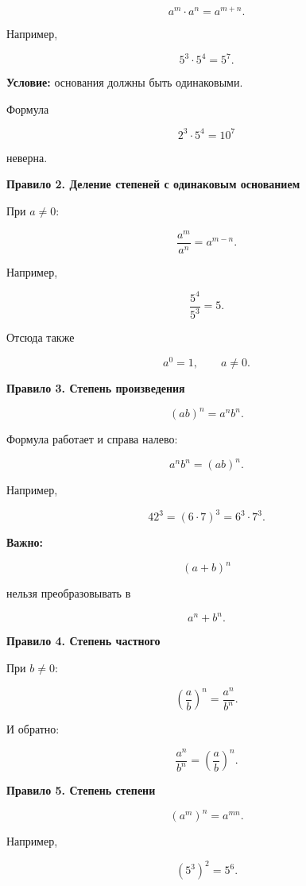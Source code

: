 \documentclass[a4paper,12pt]{article}
\newcommand{\SubSection}[1]{%
  \vspace{0.5em}
  {\large\bfseries\color{accent}#1\par}
  \vspace{0.2em}
}
\newcommand{\important}[1]{\textbf{\color{darkaccent}#1}}
\begin{document}
\[
a^m\cdot a^n=a^{m+n}.
\]

Например,

\[
5^3\cdot5^4=5^7.
\]

\important{Условие:} основания должны быть одинаковыми.

Формула

\[
2^3\cdot5^4=10^7
\]

неверна.


\SubSection{Правило 2. Деление степеней с одинаковым основанием}

При \(a\ne0\):

\[
\frac{a^m}{a^n}=a^{m-n}.
\]

Например,

\[
\frac{5^4}{5^3}=5.
\]

Отсюда также

\[
a^0=1,
\qquad a\ne0.
\]


\SubSection{Правило 3. Степень произведения}

\[
(ab)^n=a^nb^n.
\]

Формула работает и справа налево:

\[
a^nb^n=(ab)^n.
\]

Например,

\[
42^3
=
(6\cdot7)^3
=
6^3\cdot7^3.
\]

\important{Важно:}

\[
(a+b)^n
\]

нельзя преобразовывать в

\[
a^n+b^n.
\]


\SubSection{Правило 4. Степень частного}

При \(b\ne0\):

\[
\left(\frac ab\right)^n
=
\frac{a^n}{b^n}.
\]

И обратно:

\[
\frac{a^n}{b^n}
=
\left(\frac ab\right)^n.
\]


\SubSection{Правило 5. Степень степени}

\[
(a^m)^n=a^{mn}.
\]

Например,

\[
(5^3)^2=5^6.
\]
\end{document}
